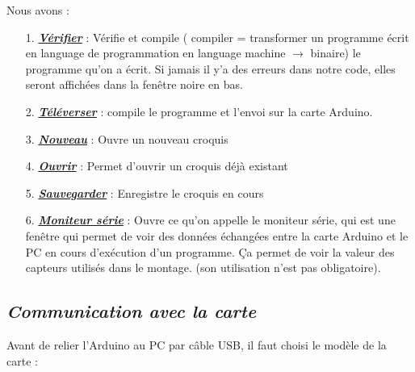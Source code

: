 \documentclass[12pt,a4paper]{article}
\begin{document}
\bigskip
Nous avons : 

\begin{itemize}
    \item[1.] \textit{\underline{\textbf{Vérifier}}} : Vérifie et compile ( compiler = transformer un programme écrit en  language de programmation en language machine $\rightarrow$ binaire) le programme qu’on a écrit. Si jamais il y’a des erreurs dans notre code, elles seront affichées dans la fenêtre noire en bas.
    
    \bigskip
    \item[2.] \textit{\underline{\textbf{Téléverser}}} : compile le programme et l’envoi sur la carte Arduino.
    
    \bigskip
    \item[3.] \textit{\underline{\textbf{Nouveau}}} : Ouvre un nouveau croquis
    
    \bigskip
    \item[4.] \textit{\underline{\textbf{Ouvrir}}} :  Permet d’ouvrir un croquis déjà existant
    
    \bigskip
    \item[5.] \textit{\underline{\textbf{Sauvegarder}}} : Enregistre le croquis en cours
    
    \bigskip
    \item[6.] \textit{\underline{\textbf{Moniteur série}}} : Ouvre ce qu’on appelle le moniteur série, qui est une fenêtre qui permet de voir des données échangées entre la carte Arduino et le PC en cours d'exécution d’un programme. Ça permet de voir la valeur des capteurs utilisés dans le montage. (son utilisation n’est pas obligatoire). 
\end{itemize}

\newpage
\subsection{\textit{\textbf{Communication avec la carte}}}
Avant de relier l’Arduino au PC par câble USB, il faut choisi le modèle de la carte :
\end{document}
